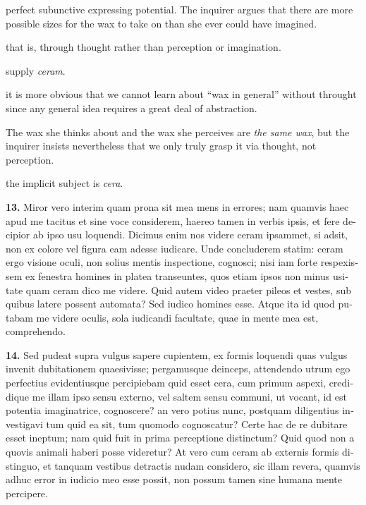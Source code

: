  perfect subunctive expressing potential. The inquirer argues that there are more possible sizes for the wax to take on than she ever could have imagined.

 that is, through thought rather than perception or imagination.

 supply \textit{ceram}.

 it is more obvious that we cannot learn about ``wax in general'' without throught since any general idea requires a great deal of abstraction.

 The wax she thinks about and the wax she perceives are \textit{the same wax}, but the inquirer insists nevertheless that we only truly grasp it via thought, not perception.

 the implicit subject is \textit{cera}.

\clearpage

\beginnumbering
\pstart
\begin{latin}
    \textenglish{\textbf{13.}} Miror vero interim quam prona sit mea mens in errores; nam quamvis haec apud me tacitus et sine voce considerem, haereo tamen in verbis ipsis, et fere decipior ab ipso usu loquendi. Dicimus enim nos videre ceram ipsammet, si adsit, non ex colore vel figura eam adesse iudicare. Unde concluderem statim: ceram ergo visione oculi, non solius mentis inspectione, cognosci; nisi iam forte respexissem ex fenestra homines in platea transeuntes, quos etiam ipsos non minus usitate quam ceram dico me videre. Quid autem video praeter pileos et vestes, sub quibus latere possent automata? Sed iudico homines esse. Atque ita id quod putabam me videre oculis, sola iudicandi facultate, quae in mente mea est, comprehendo.
\end{latin}
\pend
\endnumbering

\beginnumbering
\pstart
\begin{latin}
    \textenglish{\textbf{14.}} Sed pudeat supra vulgus sapere cupientem, ex formis loquendi quas vulgus invenit dubitationem quaesivisse; pergamusque deinceps, attendendo utrum ego perfectius evidentiusque percipiebam quid esset cera, cum primum aspexi, credidique me illam ipso sensu externo, vel saltem sensu communi, ut vocant, id est potentia imaginatrice, cognoscere? an vero potius nunc, postquam diligentius investigavi tum quid ea sit, tum quomodo cognoscatur? Certe hac de re dubitare esset ineptum; nam quid fuit in prima perceptione distinctum? Quid quod non a quovis animali haberi posse videretur? At vero cum ceram ab externis formis distinguo, et tanquam vestibus detractis nudam considero, sic illam revera, quamvis adhuc error in iudicio meo esse possit, non possum tamen sine humana mente percipere.
\end{latin}
\pend
\endnumbering

